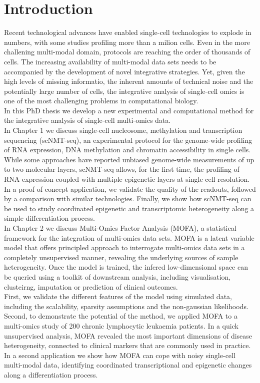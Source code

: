 \section{Introduction}

Recent technological advances have enabled single-cell technologies to explode in numbers, with some studies profiling more than a milion cells. Even in the more challening multi-modal domain, protocols are reaching the order of thousands of cells. The increasing availability of multi-modal data sets needs to be accompanied by the development of novel integrative strategies. Yet, given the high levels of missing informatio, the inherent amounts of technical noise and the potentially large number of cells, the integrative analysis of single-cell omics is one of the most challenging problems in computational biology. \\

In this PhD thesis we develop a new experimental and computational method for the integrative analysis of single-cell multi-omics data.\\

In Chapter 1 we discuss single-cell nucleosome, methylation and transcription sequencing (scNMT-seq), an experimental protocol for the genome-wide profiling of RNA expression, DNA methylation and chromatin accessibility in single cells. While some approaches have reported unbiased genome-wide measurements of up to two molecular layers, scNMT-seq allows, for the first time, the profiling of RNA expression coupled with multiple epigenetic layers at single cell resolution.\\
In a proof of concept application, we validate the quality of the readouts, followed by a comparison with similar technologies. Finally, we show how scNMT-seq can be used to study coordinated epigenetic and transcriptomic heterogeneity along a simple differentiation process.\\

In Chapter 2 we discuss Multi-Omics Factor Analysis (MOFA), a statistical framework for the integration of multi-omics data sets. MOFA is a latent variable model that offers principled approach to interrogate multi-omics data sets in a completely unsupervised manner, revealing the underlying sources of sample heterogeneity. Once the model is trained, the infered low-dimensional space can be queried using a toolkit of downstream analysis, including visualisation, clusteirng, imputation or prediction of clinical outcomes.\\
First, we validate the different features of the model using simulated data, including the scalability, sparsity assumptions and the non-gaussian likelihoods. Second, to demonstrate the potential of the method, we applied MOFA to a multi-omics study of 200 chronic lymphocytic leukaemia patients. In a quick unsupervised analysis, MOFA revealed the most important dimensions of disease heterogeneity, connected to clinical markers that are commonly used in practice. In a second application we show how MOFA can cope with noisy single-cell multi-modal data, identifying coordinated transcriptional and epigenetic changes along a differentiation process.

